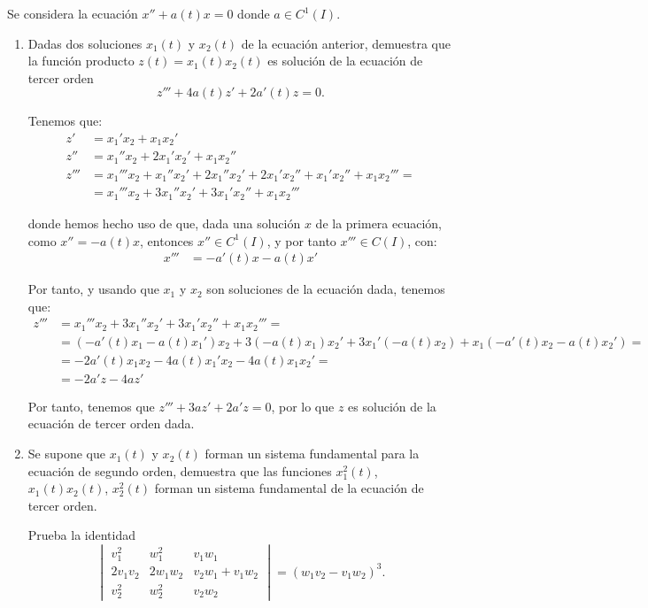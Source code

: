 \begin{ejercicio}\label{ej:4.8}
    Se considera la ecuación $x'' + a(t)x = 0$ donde $a \in C^1(I)$.
    \begin{enumerate}
        \item Dadas dos soluciones $x_1(t)$ y $x_2(t)$ de la ecuación anterior, demuestra que la función producto $z(t) = x_1(t)x_2(t)$ es solución de la ecuación de tercer orden
        \[
            z''' + 4a(t)z' + 2a'(t)z = 0.
        \]

        Tenemos que:
        \begin{align*}
            z'&=x_1'x_2+x_1x_2'\\
            z''&=x_1''x_2+2x_1'x_2'+x_1x_2''\\
            z'''&=x_1'''x_2+x_1''x_2'+2x_1''x_2'+2x_1'x_2''+x_1'x_2''+x_1x_2'''
            =\\&= x_1'''x_2+3x_1''x_2'+3x_1'x_2''+x_1x_2'''
        \end{align*}

        donde hemos hecho uso de que, dada una solución $x$ de la primera ecuación, como $x''=-a(t)x$, entonces $x''\in C^1(I)$, y por tanto $x'''\in C(I)$, con:
        \begin{align*}
            x'''&=-a'(t)x - a(t)x'
        \end{align*}

        Por tanto, y usando que $x_1$ y $x_2$ son soluciones de la ecuación dada, tenemos que:
        \begin{align*}
            z'''&=x_1'''x_2+3x_1''x_2'+3x_1'x_2''+x_1x_2'''
            =\\&=(-a'(t)x_1-a(t)x_1')x_2+3(-a(t)x_1)x_2'+3x_1'(-a(t)x_2)+x_1(-a'(t)x_2-a(t)x_2')
            =\\&=-2a'(t)x_1x_2 -4a(t)x_1'x_2 -4a(t)x_1x_2'
            =\\&= -2a'z-4az'
        \end{align*}

        Por tanto, tenemos que $z'''+3az'+2a'z=0$, por lo que $z$ es solución de la ecuación de tercer orden dada.
        \item Se supone que $x_1(t)$ y $x_2(t)$ forman un sistema fundamental para la ecuación de segundo orden, demuestra que las funciones $x_1^2(t)$, $x_1(t)x_2(t)$, $x_2^2(t)$ forman un sistema fundamental de la ecuación de tercer orden.
        \begin{observacion}
            Prueba la identidad
            \[
                \begin{vmatrix}
                    v_1^2 & w_1^2 & v_1w_1\\
                    2v_1v_2 & 2w_1w_2 & v_2w_1 + v_1w_2\\
                    v_2^2 & w_2^2 & v_2w_2
                \end{vmatrix} = (w_1v_2 - v_1w_2)^3.
            \]
        \end{observacion}


\end{enumerate}
\end{ejercicio}
